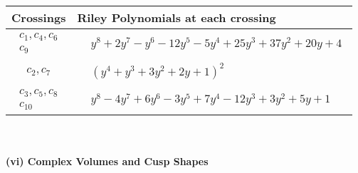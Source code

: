 \documentclass[1p]{elsarticle_modified}
\theoremstyle{definition}
\begin{document}
\begin{tabular}{m{50pt}|m{274pt}}
Crossings & \hspace{64pt}Riley Polynomials at each crossing \\
\hline $$\begin{aligned}c_{1},c_{4},c_{6}\\c_{9}\end{aligned}$$&$\begin{aligned}
&y^8+2 y^7- y^6-12 y^5-5 y^4+25 y^3+37 y^2+20 y+4
\end{aligned}$\\
\hline $$\begin{aligned}c_{2},c_{7}\end{aligned}$$&$\begin{aligned}
&(y^4+y^3+3 y^2+2 y+1)^2
\end{aligned}$\\
\hline $$\begin{aligned}c_{3},c_{5},c_{8}\\c_{10}\end{aligned}$$&$\begin{aligned}
&y^8-4 y^7+6 y^6-3 y^5+7 y^4-12 y^3+3 y^2+5 y+1
\end{aligned}$\\
\hline
\end{tabular}\\~\\
\newpage\flushleft \textbf{(vi) Complex Volumes and Cusp Shapes}
\end{document}
